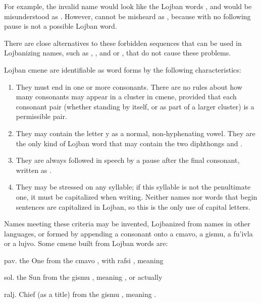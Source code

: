 For example, the invalid name  would look like the Lojban words , and  would be misunderstood as . However,  cannot be misheard as , because  with no following pause is not a possible Lojban word.

There are close alternatives to these forbidden sequences that can be used in Lojbanizing names, such as , , and  or , that do not cause these problems.

Lojban cmene are identifiable as word forms by the following characteristics:

\begin{enumerate}
\item They must end in one or more consonants. There are no rules about how many consonants may appear in a cluster in cmene, provided that each consonant pair (whether standing by itself, or as part of a larger cluster) is a permissible pair.
\item They may contain the letter y as a normal, non-hyphenating vowel. They are the only kind of Lojban word that may contain the two diphthongs  and .
\item They are always followed in speech by a pause after the final consonant, written as .
\item They may be stressed on any syllable; if this syllable is not the penultimate one, it must be capitalized when writing. Neither names nor words that begin sentences are capitalized in Lojban, so this is the only use of capital letters.
\end{enumerate}

Names meeting these criteria may be invented, Lojbanized from names in other languages, or formed by appending a consonant onto a cmavo, a gismu, a fu'ivla or a lujvo. Some cmene built from Lojban words are:
\begin{example}
pav.\n
the One\n
from the cmavo , with rafsi , meaning 
\end{example}

\begin{example}
sol.\n
the Sun\n
from the gismu , meaning , or actually\n
\T	{}
\end{example}

\begin{example}
ralj.\n
Chief (as a title)\n
from the gismu , meaning .
\end{example}

